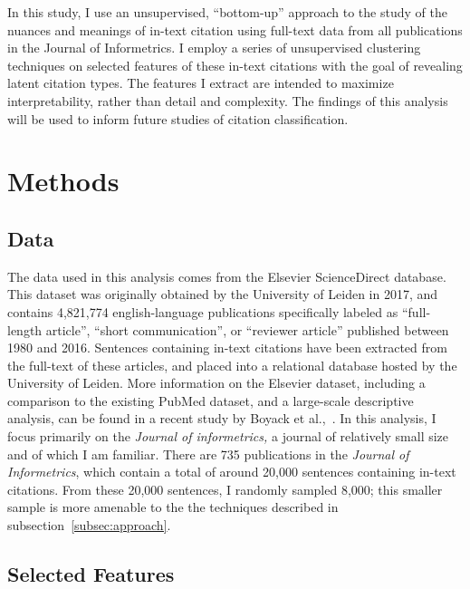 \documentclass[
10pt, %
a4paper, %
oneside, %
headinclude,footinclude, %
BCOR5mm, %
]{scrartcl}
\begin{document}
In this study, I use an unsupervised, “bottom-up” approach to the study of the nuances and meanings of in-text citation using full-text data from all publications in the Journal of Informetrics. I employ a series of unsupervised clustering techniques on selected features of these in-text citations with the goal of revealing latent citation types. The features I extract are intended to maximize interpretability, rather than detail and complexity. The findings of this analysis will be used to inform future studies of citation classification. 


\section{Methods}

\subsection{Data}
The data used in this analysis comes from the Elsevier ScienceDirect database. This dataset was originally obtained by the University of Leiden in 2017, and contains 4,821,774 english-language publications specifically labeled as “full-length article”, “short communication”, or “reviewer article” published between 1980 and 2016. Sentences containing in-text citations have been extracted from the full-text of these articles, and placed into a relational database hosted by the University of Leiden. More information on the Elsevier dataset, including a comparison to the existing PubMed dataset, and a large-scale descriptive analysis, can be found in a recent study by Boyack et al.,~\cite{boyack_characterizing_2018}. In this analysis, I focus primarily on the \textit{Journal of informetrics,} a journal of relatively small size and of which I am familiar. There are 735 publications in the \textit{Journal of Informetrics}, which contain a total of around 20,000 sentences containing in-text citations. From these 20,000 sentences, I randomly sampled 8,000; this smaller sample is more amenable to the the techniques described in subsection~\ref{subsec:approach}. 


\subsection{Selected Features}
\end{document}
